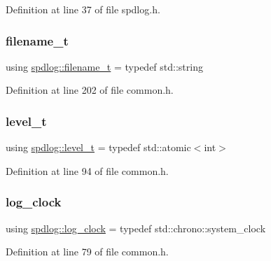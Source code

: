 Definition at line 37 of file spdlog.\+h.

\mbox{\label{namespacespdlog_acf7ce125b3622e44f8f1702d699e0b06}} 
\subsubsection{\texorpdfstring{filename\+\_\+t}{filename\_t}}
{\footnotesize\ttfamily using \hyperlink{namespacespdlog_acf7ce125b3622e44f8f1702d699e0b06}{spdlog\+::filename\+\_\+t} = typedef std\+::string}



Definition at line 202 of file common.\+h.

\mbox{\label{namespacespdlog_a8585bf495310a6ce695191739351709b}} 
\subsubsection{\texorpdfstring{level\+\_\+t}{level\_t}}
{\footnotesize\ttfamily using \hyperlink{namespacespdlog_a8585bf495310a6ce695191739351709b}{spdlog\+::level\+\_\+t} = typedef std\+::atomic$<$int$>$}



Definition at line 94 of file common.\+h.

\mbox{\label{namespacespdlog_a173dd7064323e4807d720eabcc95fc73}} 
\subsubsection{\texorpdfstring{log\+\_\+clock}{log\_clock}}
{\footnotesize\ttfamily using \hyperlink{namespacespdlog_a173dd7064323e4807d720eabcc95fc73}{spdlog\+::log\+\_\+clock} = typedef std\+::chrono\+::system\+\_\+clock}



Definition at line 79 of file common.\+h.

\mbox{\label{namespacespdlog_ad3ed787a29f245c833ef66faf48036e2}} 
